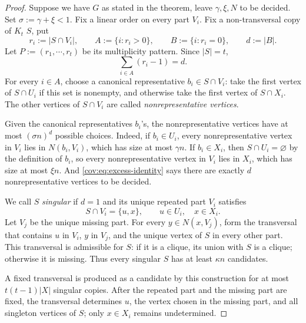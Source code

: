 \documentclass[11pt]{article}
\numberwithin{equation}{section}
\theoremstyle{remark}
\begin{document}
\begin{proof}
Suppose we have \(G\) as stated in the theorem, leave \(\gamma, \xi, N\) to be decided. 
Set \(\sigma:=\gamma+\xi<1\). Fix a linear order on every part \(V_i\).
Fix a non-transversal copy of \(K_t\) \(S\), put
\begin{equation*}
r_i:=|S\cap V_i|,
\qquad
A:=\{i:r_i>0\},
\qquad
B:=\{i:r_i=0\},
\qquad
d:=|B|.
\end{equation*}
Let \(P:=(r_1,\cdots,r_t)\) be its multiplicity pattern. Since \(|S|=t\),
\begin{equation}\label{cov:eq:excess-identity}
\sum_{i\in A}(r_i-1)=d.
\end{equation}
For every \(i\in A\), choose a canonical representative \(b_i\in S\cap V_i\):
take the first vertex of \(S\cap U_i\) if this set is nonempty, and otherwise
take the first vertex of \(S\cap X_i\). The other vertices of \(S\cap V_i\) are called \emph{nonrepresentative vertices}.

Given the canonical representatives \(b_i\)'s, the nonrepresentative vertices have at most \((\sigma n)^d\)
possible choices. Indeed, if \(b_i\in U_i\), every nonrepresentative vertex in \(V_i\) lies in \(N(b_i,V_i)\),
which has size at most \(\gamma n\). If \(b_i\in X_i\), then \(S\cap U_i=\varnothing\) by the definition of \(b_i\),
so every nonrepresentative vertex in \(V_i\) lies in \(X_i\), which has size at most \(\xi n\).
And \eqref{cov:eq:excess-identity} says there are exactly \(d\) nonrepresentative vertices to be decided.

We call \(S\) \emph{singular} if \(d=1\) and its unique repeated part \(V_i\) satisfies
\begin{equation*}
S\cap V_i=\{u,x\},
\qquad u\in U_i,
\quad x\in X_i.
\end{equation*}
Let \(V_j\) be the unique missing part. For every \(y\in N(x,V_j)\), form the transversal that
contains \(u\) in \(V_i\), \(y\) in \(V_j\), and the unique vertex of \(S\) in every other part.
This transversal is admissible for \(S\): if it is a clique, its union with \(S\) is a clique;
otherwise it is missing. Thus every singular \(S\) has at least \(\kappa n\) candidates.

A fixed transversal is produced as a candidate by this construction for at most \(t(t-1)|X|\) singular copies.
After the repeated part and the missing part are fixed, the transversal determines \(u\), the vertex chosen
in the missing part, and all singleton vertices of \(S\); only \(x\in X_i\) remains undetermined.


\end{proof}
\end{document}
